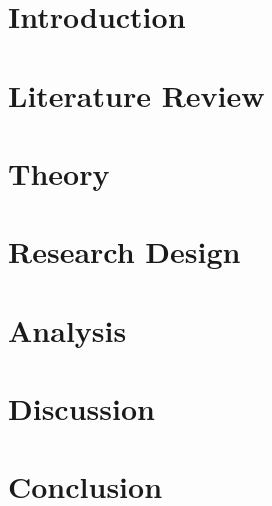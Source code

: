 \documentclass[12pt]{report} %
\begin{document}
\listoffigures

\listoftables

\chapter{Introduction} \label{chp:introduction}


\chapter{Literature Review} \label{chp:literature}


\chapter{Theory} \label{chp:theory}


\chapter{Research Design} \label{chp:research_design}


\chapter{Analysis} \label{chp:analysis}


\chapter{Discussion}
 \label{chp:discussion}

\chapter{Conclusion}
 \label{chp:conclusion}


\end{document}
